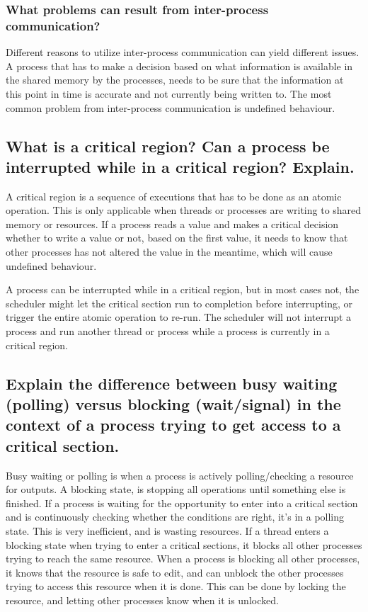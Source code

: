 \documentclass[a4paper]{article}
\begin{document}
\subsubsection{What problems can result from inter-process communication?}

Different reasons to utilize inter-process communication can yield different issues. A process that has to make a decision based on what information is available in the shared memory by the processes, needs to be sure that the information at this point in time is accurate and not currently being written to. The most common problem from inter-process communication is undefined behaviour. 


\subsection{What is a critical region? Can a process be interrupted while in a critical region? Explain.}
 
 A critical region is a sequence of executions that has to be done as an atomic operation. This is only applicable when threads or processes are writing to shared memory or resources. If a process reads a value and makes a critical decision whether to write a value or not, based on the first value, it needs to know that other processes has not altered the value in the meantime, which will cause undefined behaviour. 
 
 A process can be interrupted while in a critical region, but in most cases not, the scheduler might let the critical section run to completion before interrupting, or trigger the entire atomic operation to re-run. The scheduler will not interrupt a process and run another thread or process while a process is currently in a critical region.


\subsection{Explain the difference between busy waiting (polling) versus blocking (wait/signal) in the context of a
process trying to get access to a critical section.}

Busy waiting or polling is when a process is actively polling/checking a resource for outputs. A blocking state, is stopping all operations until something else is finished. If a process is waiting for the opportunity to enter into a critical section and is continuously checking whether the conditions are right, it's in a polling state. This is very inefficient, and is wasting resources. If a thread enters a blocking state when trying to enter a critical sections, it blocks all other processes trying to reach the same resource. When a process is blocking all other processes, it knows that the resource is safe to edit, and can unblock the other processes trying to access this resource when it is done. This can be done by locking the resource, and letting other processes know when it is unlocked.
\end{document}
